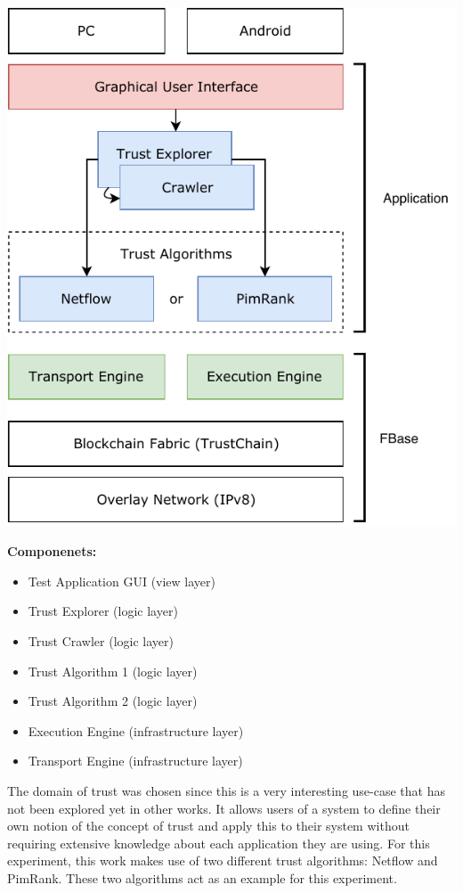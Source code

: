 \begin{minipage}[c]{0.45\textwidth}
	\includegraphics[width=\textwidth]{images/evaluation-trust-experiment-overview2.pdf}
\end{minipage}
\hfill
\begin{minipage}[c]{0.45\textwidth}
	{\large\textbf{Componenets:}}
	\begin{itemize}
		\item Test Application GUI (view layer)
		\item Trust Explorer (logic layer)
		\item Trust Crawler (logic layer)
		\item Trust Algorithm 1 (logic layer)
		\item Trust Algorithm 2 (logic layer)
		\item Execution Engine (infrastructure layer)
		\item Transport Engine (infrastructure layer)
	\end{itemize}
\end{minipage}

\vspace{0.5cm}

The domain of trust was chosen since this is a very interesting use-case that has not been explored yet in other works. It allows users of a system to define their own notion of the concept of trust and apply this to their system without requiring extensive knowledge about each application they are using. For this experiment, this work makes use of two different trust algorithms: Netflow and PimRank. These two algorithms act as an example for this experiment.

